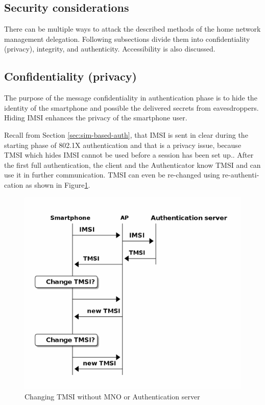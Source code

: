 \documentclass[12pt,a4paper,english]{tutthesis}
\begin{document}
\begin{otherlanguage}{english}
\section{Security considerations}
\label{sec-6-4}



There can be multiple ways to attack the described methods of
the home network management delegation. Following subsections divide them into
confidentiality (privacy), integrity, and
authenticity. Accessibility is also discussed.
\subsection{Confidentiality (privacy)}
\label{sec-6-4-1}

The purpose of the message confidentiality in authentication phase is
to hide the identity of the smartphone and possible the delivered
secrets from eavesdroppers. Hiding IMSI enhances the privacy of the smartphone user. 


Recall from Section \ref{sec:sim-based-auth}, that IMSI is sent in clear 
during the starting phase of 802.1X authentication and that is a privacy 
issue, because TMSI which hides IMSI cannot be used before a session
has been set up.\cite[p.66]{rfc4186}.
After the first full authentication, the client and the Authenticator 
know TMSI and can use it in further communication. 
TMSI can even be re-changed using re-authentication as shown in Figure\ref{fig:tmsi}.

\begin{figure}[htb]
\centering
\includegraphics[width=.9\linewidth]{imsi-tmsi.png}
\caption{\label{fig:tmsi}Changing TMSI without MNO or Authentication server}
\end{figure}





\end{otherlanguage}
\end{document}
